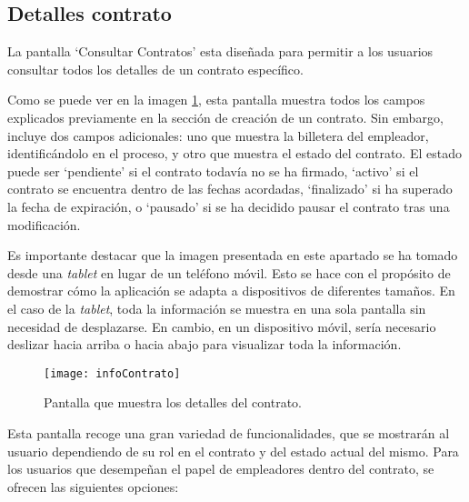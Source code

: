 \subsection{Detalles contrato}

La pantalla `Consultar Contratos' esta diseñada para permitir a los usuarios consultar todos los detalles de un contrato específico.

Como se puede ver en la imagen \ref{fig:infoContrato}, esta pantalla muestra todos los campos explicados previamente en la sección de creación de un contrato. Sin embargo, incluye dos campos adicionales: uno que muestra la billetera del empleador, identificándolo en el proceso, y otro que muestra el estado del contrato. El estado puede ser `pendiente' si el contrato todavía no se ha firmado, `activo' si el contrato se encuentra dentro de las fechas acordadas, `finalizado' si ha superado la fecha de expiración, o `pausado' si se ha decidido pausar el contrato tras una modificación.

Es importante destacar que la imagen presentada en este apartado se ha tomado desde una \textit{tablet} en lugar de un teléfono móvil. Esto se hace con el propósito de demostrar cómo la aplicación se adapta a dispositivos de diferentes tamaños. En el caso de la \textit{tablet}, toda la información se muestra en una sola pantalla sin necesidad de desplazarse. En cambio, en un dispositivo móvil, sería necesario deslizar hacia arriba o hacia abajo para visualizar toda la información.

\begin{figure}[h]
	\centering
	\texttt{[image: infoContrato]}
	\caption[Pantalla detalles del contrato]{Pantalla que muestra los detalles del contrato.}
	\label{fig:infoContrato}
\end{figure}

Esta pantalla recoge una gran variedad de funcionalidades, que se mostrarán al usuario dependiendo de su rol en el contrato y del estado actual del mismo.
Para los usuarios que desempeñan el papel de empleadores dentro del contrato, se ofrecen las siguientes opciones:

